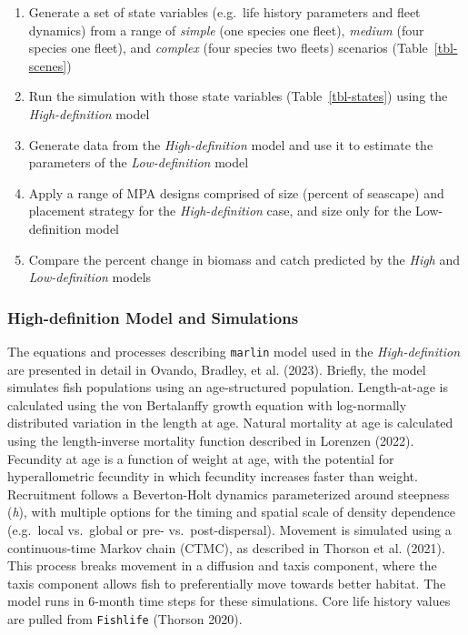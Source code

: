 \documentclass[
  default,
  lineno,
  referee]{sn-jnl}
\providecommand{\tightlist}{%
  \setlength{\itemsep}{0pt}\setlength{\parskip}{0pt}}\usepackage{longtable,booktabs,array}
\begin{document}
\begin{enumerate}
\def\labelenumi{\arabic{enumi}.}
\tightlist
\item
  Generate a set of state variables (e.g.~life history parameters and
  fleet dynamics) from a range of \emph{simple} (one species one fleet),
  \emph{medium} (four species one fleet), and \emph{complex} (four
  species two fleets) scenarios (Table~\ref{tbl-scenes})
\item
  Run the simulation with those state variables (Table~\ref{tbl-states})
  using the \emph{High-definition} model
\item
  Generate data from the \emph{High-definition} model and use it to
  estimate the parameters of the \emph{Low-definition} model
\item
  Apply a range of MPA designs comprised of size (percent of seascape)
  and placement strategy for the \emph{High-definition} case, and size
  only for the Low-definition model
\item
  Compare the percent change in biomass and catch predicted by the
  \emph{High} and \emph{Low-definition} models
\end{enumerate}

\subsubsection{High-definition Model and
Simulations}\label{high-definition-model-and-simulations}

The equations and processes describing \texttt{marlin} model used in the
\emph{High-definition} are presented in detail in Ovando, Bradley, et
al. (2023). Briefly, the model simulates fish populations using an
age-structured population. Length-at-age is calculated using the von
Bertalanffy growth equation with log-normally distributed variation in
the length at age. Natural mortality at age is calculated using the
length-inverse mortality function described in Lorenzen (2022).
Fecundity at age is a function of weight at age, with the potential for
hyperallometric fecundity in which fecundity increases faster than
weight. Recruitment follows a Beverton-Holt dynamics parameterized
around steepness (\emph{h}), with multiple options for the timing and
spatial scale of density dependence (e.g.~local vs.~global or pre-
vs.~post-dispersal). Movement is simulated using a continuous-time
Markov chain (CTMC), as described in Thorson et al. (2021). This process
breaks movement in a diffusion and taxis component, where the taxis
component allows fish to preferentially move towards better habitat. The
model runs in 6-month time steps for these simulations. Core life
history values are pulled from \texttt{Fishlife} (Thorson 2020).
\end{document}
